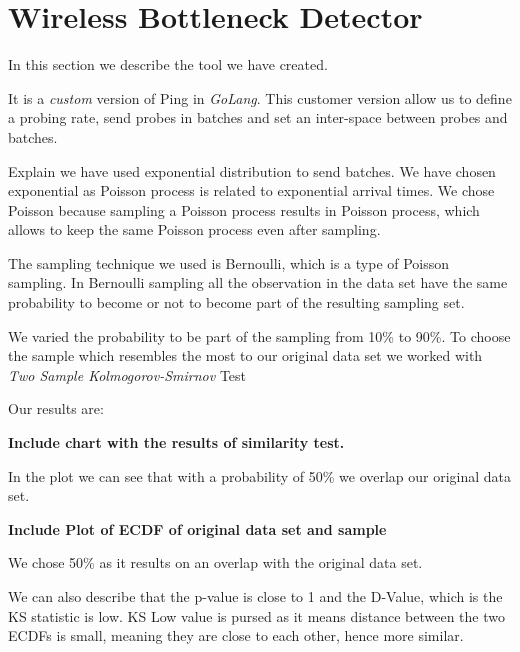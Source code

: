 \section{Wireless Bottleneck Detector}\label{Wireless Bottleneck Detector}

In this section we describe the tool we have created.

It is a \emph{custom} version of Ping in \emph{GoLang}. This customer version allow us to define a probing rate, send probes in batches and set an inter-space between probes and batches.

Explain we have used exponential distribution to send batches. We have chosen exponential as Poisson process is related to exponential arrival times. We chose Poisson because sampling a Poisson process results in Poisson process, which allows to keep the same Poisson process even after sampling.

The sampling technique we used is Bernoulli, which is a type of Poisson sampling. In Bernoulli sampling all the observation in the data set have the same probability to become or not to become part of the resulting sampling set.

We varied the probability to be part of the sampling from 10\% to 90\%. To choose the sample which resembles the most to our original data set we worked with \emph{Two Sample Kolmogorov-Smirnov} Test

Our results are:

\textbf{Include chart with the results of similarity test.}

In the plot we can see that with a probability of 50\% we overlap our original data set.

\textbf{Include Plot of ECDF of original data set and sample}

We chose 50\% as it results on an overlap with the original data set.

We can also describe that the p-value is close to 1 and the D-Value, which is the KS statistic is low. KS Low value is pursed as it means distance between the two ECDFs is small, meaning they are close to each other, hence more similar.